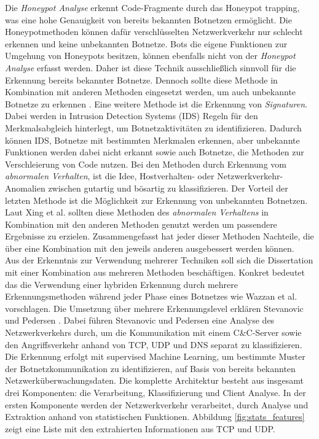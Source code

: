Die \textit{Honeypot Analyse} erkennt Code-Fragmente durch das Honeypot trapping, was eine hohe Genauigkeit von bereits bekannten Botnetzen ermöglicht. Die Honeypotmethoden können dafür
verschlüsselten Netzwerkverkehr nur schlecht erkennen und keine unbekannten Botnetze. Bots die eigene Funktionen zur Umgehung von Honeypots besitzen, können ebenfalls nicht von der \textit{Honeypot
Analyse} erfasst werden. Daher ist diese Technik ausschließlich sinnvoll für die Erkennung bereits bekannter Botnetze. Dennoch sollte
diese Methode in Kombination mit anderen Methoden eingesetzt werden, um auch unbekannte Botnetze zu erkennen \cite{Xing2021SurveyOB}. Eine weitere Methode ist die Erkennung von \textit{Signaturen}.
Dabei werden in Intrusion Detection Systems (IDS) Regeln für den Merkmalsabgleich hinterlegt, um Botnetzaktivitäten zu identifizieren. Dadurch können IDS, Botnetze mit bestimmten Merkmalen
erkennen, aber unbekannte Funktionen werden dabei nicht erkannt sowie auch Botnetze, die Methoden zur Verschleierung von Code nutzen. Bei den Methoden durch Erkennung vom
\textit{abnormalen Verhalten}, ist die Idee, Hostverhalten- oder Netzwerkverkehr-Anomalien zwischen gutartig und bösartig zu klassifizieren. Der Vorteil der letzten
Methode ist die Möglichkeit zur Erkennung von unbekannten Botnetzen. Laut Xing et al. sollten diese Methoden des \textit{abnormalen Verhaltens} in Kombination mit den anderen Methoden genutzt werden
um passendere Ergebnisse zu erzielen. Zusammengefasst hat jeder dieser Methoden Nachteile, die über eine Kombination mit den jeweils anderen ausgebessert werden können. \\ Aus der Erkenntnis zur
Verwendung mehrerer Techniken soll sich die Dissertation mit einer Kombination aus mehreren Methoden beschäftigen. Konkret bedeutet das die Verwendung einer hybriden Erkennung durch mehrere
Erkennungsmethoden während jeder Phase eines Botnetzes wie Wazzan et al. \cite{Wazzan2021InternetOT} vorschlagen. Die Umsetzung über mehrere Erkennungslevel erklären Stevanovic und Pedersen
\cite{DBLP:journals/ijcysa/StevanovicP16}. Dabei führen Stevanovic und Pedersen eine Analyse des Netzwerkverkehrs durch, um die Kommunikation mit einem C\&C-Server sowie den Angriffsverkehr anhand
von TCP, UDP und DNS separat zu klassifizieren. Die Erkennung erfolgt mit supervised Machine Learning, um bestimmte Muster der Botnetzkommunikation zu identifizieren, auf Basis von bereits bekannten
Netzwerküberwachungsdaten. Die komplette Architektur besteht aus insgesamt drei Komponenten: die Verarbeitung, Klassifizierung und Client Analyse. In der ersten Komponente werden der Netzwerkverkehr
verarbeitet, durch Analyse und Extraktion anhand von statistischen Funktionen. Abbildung \ref{fig:stats_features} zeigt eine Liste mit den extrahierten Informationen aus TCP und UDP.

